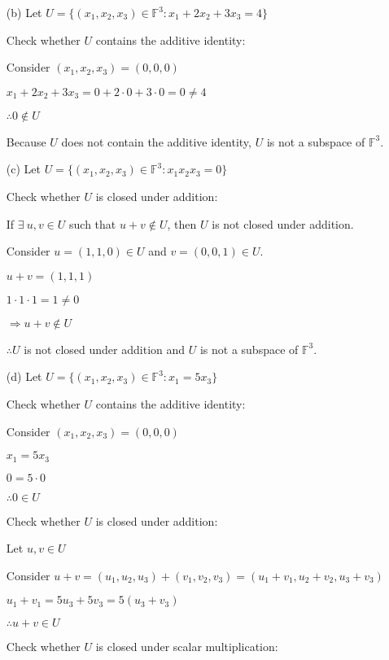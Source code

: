 \documentclass{article}
\begin{document}
\begin{enumerate}[nolistsep]
\begin{enumerate}[nolistsep]
			\item[(b)] Let $U = {\{(x_1, x_2, x_3) \in \mathbb{F}^3 : x_1 + 2x_2 + 3x_3 = 4 \}}$
			
			Check whether $U$ contains the additive identity:
			
			Consider $(x_1, x_2, x_3) = (0, 0, 0)$
			
			$x_1 + 2x_2 + 3x_3 = 0 + 2 \cdot 0 + 3 \cdot 0 = 0 \neq 4$
			
			$\therefore 0 \notin U$
			
			Because $U$ does not contain the additive identity, $U$ is not a subspace of $\mathbb{F}^3$.

			\item[(c)] Let $U = {\{(x_1, x_2, x_3) \in \mathbb{F}^3 : x_1x_2x_3 = 0 \}}$
			
			Check whether $U$ is closed under addition:
			
			If $\exists\ u,v \in U$ such that $u + v \notin U$, then $U$ is not closed under addition.
			
			Consider $u = (1, 1, 0) \in U$ and $v = (0, 0, 1) \in U$.
			
			$u + v = (1, 1, 1)$
			
			$1 \cdot 1 \cdot 1 = 1 \neq 0$
			
			$\Rightarrow u + v \notin U$
			
			$\therefore U$ is not closed under addition and $U$ is not a subspace of $\mathbb{F}^3$.
			
			\item[(d)] Let $U = {\{(x_1, x_2, x_3) \in \mathbb{F}^3 : x_1 = 5x_3 \}}$
			
			Check whether $U$ contains the additive identity:
			
			Consider $(x_1, x_2, x_3) = (0, 0, 0)$
			
			$x_1 = 5x_3$
			
			$0 = 5 \cdot 0$
			
			$\therefore 0 \in U$
			
			Check whether $U$ is closed under addition:
			
			Let $u, v \in U$
			
			Consider $u + v = (u_1, u_2, u_3) + (v_1, v_2, v_3) = (u_1 + v_1, u_2 + v_2, u_3 + v_3)$
			
			$u_1 + v_1 = 5u_3 + 5v_3 = 5(u_3 + v_3)$
			
			$\therefore u + v \in U$
			
			Check whether $U$ is closed under scalar multiplication:
			

\end{enumerate}
\end{enumerate}
\end{document}
